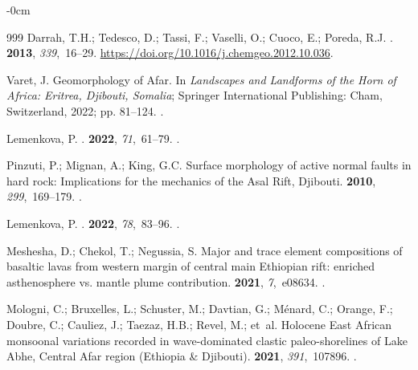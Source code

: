 \documentclass[jimaging,article,accept,pdftex,moreauthors]{Definitions/mdpi}
\begin{document}
\begin{adjustwidth}{-\extralength}{0cm}
\begin{thebibliography}{999}
Darrah, T.H.; Tedesco, D.; Tassi, F.; Vaselli, O.; Cuoco, E.; Poreda, R.J.
.
 {\bf 2013}, {\em 339},~16--29. %
\newblock 
  {\url{https://doi.org/10.1016/j.chemgeo.2012.10.036}}.

Varet, J. Geomorphology of Afar.
\newblock In {\em Landscapes and Landforms of the Horn of Africa: Eritrea,
  Djibouti, Somalia}; Springer International Publishing: Cham, Switzerland, 2022; pp.
  81--124.
.

Lemenkova, P.
.
 {\bf 2022}, {\em
  71},~61--79.
.

Pinzuti, P.; Mignan, A.; King, G.C.
\newblock Surface morphology of active normal faults in hard rock: Implications
  for the mechanics of the Asal Rift, Djibouti.
 {\bf 2010}, {\em
  299},~169--179.
.

Lemenkova, P.
.
 {\bf 2022},
  {\em 78},~83--96.
.

Meshesha, D.; Chekol, T.; Negussia, S.
\newblock Major and trace element compositions of basaltic lavas from western
  margin of central main Ethiopian rift: enriched asthenosphere vs. mantle
  plume contribution.
 {\bf 2021}, {\em 7},~e08634.
.

Mologni, C.; Bruxelles, L.; Schuster, M.; Davtian, G.; Ménard, C.; Orange, F.;
  Doubre, C.; Cauliez, J.; Taezaz, H.B.; Revel, M.;  et~al.
\newblock Holocene East African monsoonal variations recorded in wave-dominated
  clastic paleo-shorelines of Lake Abhe, Central Afar region (Ethiopia \&
  Djibouti).
 {\bf 2021}, {\em 391},~107896.
.


\end{thebibliography}
\end{adjustwidth}
\end{document}

